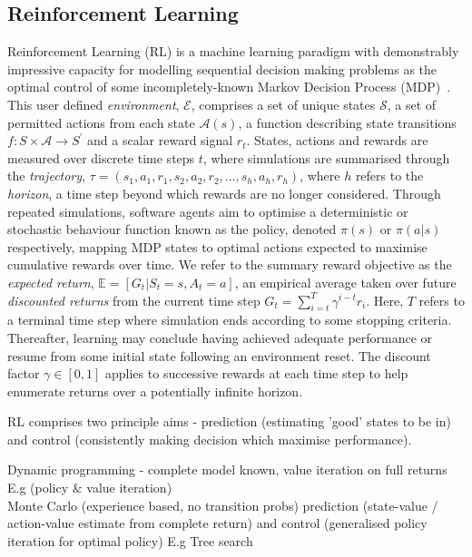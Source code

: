 \documentclass[conference,compsoc]{IEEEtran}
\begin{document}

\subsection{Reinforcement Learning}
Reinforcement Learning (RL) is a machine learning paradigm with demonstrably impressive capacity for modelling sequential decision making problems as the optimal control of some incompletely-known Markov Decision Process (MDP)~\cite{sutton2018reinforcement}. This user defined \textit{environment}, $\mathcal{E}$, comprises a set of unique states $\mathcal{S}$, a set of permitted actions from each state $\mathcal{A}(s)$, a function describing state transitions $f : S \times \mathcal{A} \to S^{\prime}$ and a scalar reward signal $r_t$. States, actions and rewards are measured over discrete time steps $t$, where simulations are summarised through the \textit{trajectory}, $\tau = (s_1, a_1, r_1,  s_2, a_2, r_2,...,s_h, a_h, r_h)$, where $h$ refers to the \textit{horizon}, a time step beyond which rewards are no longer considered. Through repeated simulations, software agents aim to optimise a deterministic or stochastic behaviour function known as the policy, denoted $\pi(s)$ or  $\pi(a|s)$ respectively, mapping MDP states to optimal actions expected to maximise cumulative rewards over time. We refer to the summary reward objective as the \textit{expected return}, $\mathbb{E}=[G_t | S_t = s, A_t = a]$, an empirical average taken over future \textit{discounted returns} from the current time step $G_{t} = \sum_{i=t}^{T}\gamma^{i-t}r_{i}$. Here, $T$ refers to a terminal time step where simulation ends according to some stopping criteria. Thereafter, learning may conclude having achieved adequate performance or resume from some initial state following an environment reset. The discount factor $\gamma \in [0,1]$ applies to successive rewards at each time step to help enumerate returns over a potentially infinite horizon. 

RL comprises two principle aims - prediction (estimating 'good' states to be in) and control (consistently making decision which maximise performance).\\


Dynamic programming - complete model known, value iteration on full returns
E.g (policy \& value iteration)\\


Monte Carlo (experience based, no transition probs) prediction (state-value / action-value estimate from complete return) and control (generalised policy iteration for optimal policy)
E.g Tree search\\
\end{document}
